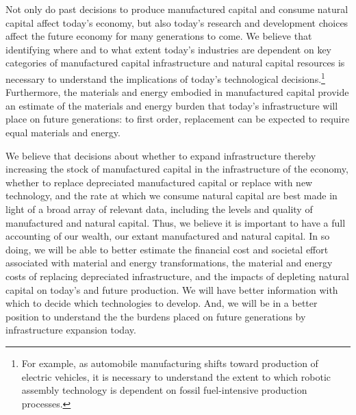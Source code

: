 Not only do past decisions to produce manufactured capital and consume natural capital 
affect today's economy, 
but also today's research and development choices
affect the future economy for many generations to come.
We believe that identifying where and to what extent today's industries are dependent on 
key categories of manufactured capital infrastructure and natural capital resources
is necessary to understand the
implications of today's technological decisions.\footnote{For
	example, as automobile manufacturing shifts toward 
	production of electric vehicles,
	it is necessary to understand the extent to which robotic assembly technology
	is dependent on fossil fuel-intensive production processes.
	}
Furthermore, the materials and energy embodied in manufactured capital
provide an estimate of the materials and energy burden that today's infrastructure 
will place on future generations:
to first order, replacement can be expected to require equal materials and energy.

We believe that decisions about 
whether to expand infrastructure 
	thereby increasing the stock 
	of manufactured capital 
	in the infrastructure of the economy, 
whether to replace depreciated manufactured capital 
	or replace with new technology, and
the rate at which we consume natural capital
are best made in light of a broad array of relevant data, 
including the levels and quality of manufactured and natural capital.
Thus, we believe it is important to have a full accounting of our wealth, our extant 
manufactured and natural capital.
In so doing, 
we will be able to better estimate 
the financial cost and societal effort 
	associated with material and energy transformations,
the material and energy costs 
	of replacing depreciated infrastructure, and
the impacts of depleting natural capital 
	on today's and future production.
We will have better information 
	with which to decide which technologies to develop.
And, we will be in a better position to
	understand the the burdens placed on future generations
	by infrastructure expansion today.

\vspace{10 mm}

